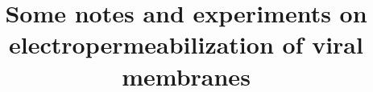 \documentclass[paper.tex]{subfiles}
\begin{document}




\title{Some notes and experiments on electropermeabilization of viral membranes}
\date{}


\flushbottom 
\maketitle
\thispagestyle{empty}

\renewcommand{\abstractname}{Summary}    %
\end{document}
